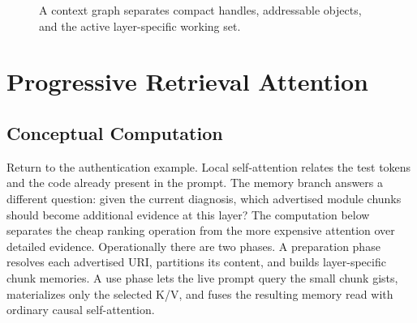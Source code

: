 \documentclass[11pt]{article}
\begin{document}
\begin{figure}[t]
\centering
{}
\caption{A context graph separates compact handles, addressable objects, and the active layer-specific working set.}
\label{fig:context-graph}
\end{figure}

\section{Progressive Retrieval Attention}

\subsection{Conceptual Computation}

Return to the authentication example.  Local self-attention relates the test tokens and
the code already present in the prompt.  The memory branch answers a different question:
given the current diagnosis, which advertised module chunks should become additional
evidence at this layer?  The computation below separates the cheap ranking operation
from the more expensive attention over detailed evidence.  Operationally there are two
phases.  A preparation phase resolves each advertised URI, partitions its content, and
builds layer-specific chunk memories.  A use phase lets the live prompt query the small
chunk gists, materializes only the selected K/V, and fuses the resulting memory read with
ordinary causal self-attention.
\end{document}
